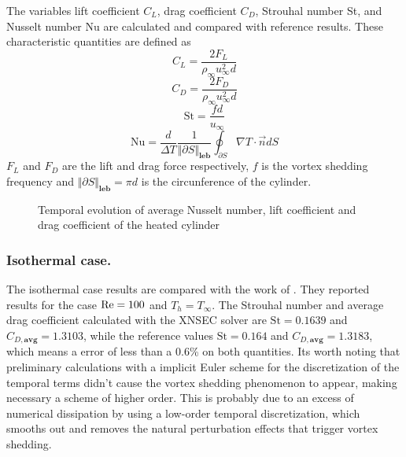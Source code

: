 The variables lift coefficient $C_L$, drag coefficient $C_D$, Strouhal number St, and Nusselt number Nu are calculated and compared with reference results. These characteristic quantities are defined as
\begin{equation} 
	C_L = \frac{2F_L}{\rho_\infty u^2_\infty d}
\end{equation}
\begin{equation}
	C_D = \frac{2F_D}{\rho_\infty u^2_\infty d}
\end{equation}
\begin{equation}
	\text{St} = \frac{fd}{u_\infty}
\end{equation}
\begin{equation}
	\text{Nu} = \frac{d}{\Delta T}\frac{1}{\Vert \partial S\Vert_{\textbf{leb}}}\oint_{\partial S} \nabla T \cdot \vec{n} dS
\end{equation}
$F_L$ and $F_D$ are the lift and drag force respectively, $f$ is the vortex shedding frequency and ${\Vert \partial S\Vert_{\textbf{leb}}}= \pi d$ is the circunference of the cylinder.
\begin{figure}[t]
	\centering	
	\caption{Temporal evolution of average Nusselt number, lift coefficient and drag coefficient of the heated cylinder}	\label{fig:HeatedCylinderResults}
\end{figure}
\subsubsection{Isothermal case.}
The isothermal case results are compared with the work of \textcite{sharmaHEATFLUIDFLOW2004}. They reported results for the case $\text{Re} = 100$ and $T_h = T_\infty$. The Strouhal number and average drag coefficient calculated with the XNSEC solver are $\text{St} = 0.1639$ and $C_{D,\textbf{avg}} = 1.3103$, while the reference values $\text{St} = 0.164$ and $C_{D,\textbf{avg}} = 1.3183$, which means a error of less than a 0.6\% on both quantities. Its worth noting that preliminary calculations with a implicit Euler scheme for the discretization of the temporal terms didn't cause the vortex shedding phenomenon to appear, making necessary a scheme of higher order. This is probably due to an excess of numerical dissipation by using a low-order temporal discretization, which smooths out and removes the natural perturbation effects that trigger vortex shedding.
